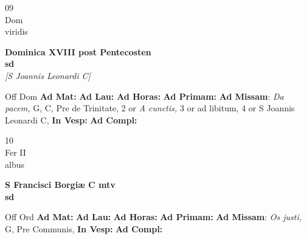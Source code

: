 \documentclass[10pt, openany]{book}
\begin{document}
        \begin{center}
            \begin{minipage}{3.5in}
                \vspace{2em}
                \begin{minipage}{0.5in}
                    {\Huge 09} \\
                    {\normalsize Dom} \\
                    {\normalsize viridis}
                \end{minipage}
                \begin{minipage}{3.0in}
                    \textbf{ \large Dominica XVIII post Pentecosten \\
                    \textnormal{\normalsize sd}} \\ \textit{[S Joannis Leonardi C]} \\ 
                \end{minipage}
                \begin{justify}Off Dom
                    \textbf{Ad Mat: }
                    \textbf{Ad Lau: }
                    \textbf{Ad Horas: }
                    \textbf{Ad Primam: }\textbf{Ad Missam}: \textit{Da pacem,} G, C, Pre de Trinitate, 2 or \textit{A cunctis,} 3 or ad libitum, 4 or S Joannis Leonardi C,  
                    \textbf{In Vesp: }
                    \textbf{Ad Compl: }
                \end{justify}
            \end{minipage}
        \end{center}
    
        \begin{center}
            \begin{minipage}{3.5in}
                \vspace{2em}
                \begin{minipage}{0.5in}
                    {\Huge 10} \\
                    {\normalsize Fer II} \\
                    {\normalsize albus}
                \end{minipage}
                \begin{minipage}{3.0in}
                    \textbf{ \large S Francisci Borgiæ C mtv \\
                    \textnormal{\normalsize sd}} \\ 
                \end{minipage}
                \begin{justify}Off Ord
                    \textbf{Ad Mat: }
                    \textbf{Ad Lau: }
                    \textbf{Ad Horas: }
                    \textbf{Ad Primam: }\textbf{Ad Missam}: \textit{Os justi,} G, Pre Communis,  
                    \textbf{In Vesp: }
                    \textbf{Ad Compl: }
                \end{justify}
            \end{minipage}
        \end{center}
    
\end{document}
